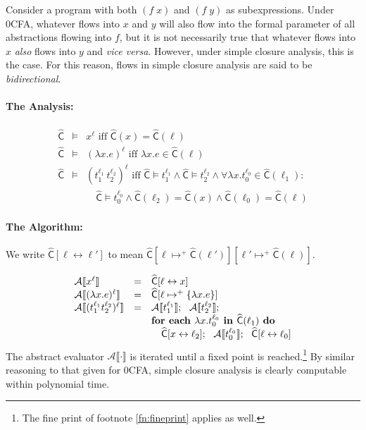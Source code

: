\documentclass{llncs}
\newcommand\av[1]{\ensuremath{\mathcal{A}\sem{#1}}}
\newcommand\sem[1]{\ensuremath{\llbracket #1 \rrbracket}}
\newcommand\cache{\widehat{\mathsf{C}}}
\begin{document}
Consider a program with both $(f\;x)$ and $(f\;y)$ as subexpressions.
Under 0CFA, whatever flows into $x$ and $y$ will also flow into the
formal parameter of all abstractions flowing into $f$, but it is not
necessarily true that whatever flows into $x$ {\em also} flows into
$y$ and {\em vice versa}.  However, under simple closure analysis,
this is the case.  For this reason, flows in simple closure analysis
are said to be {\em bidirectional}.

\paragraph{The Analysis:} 

\begin{eqnarray*}
\cache &\models & 
x^\ell \mbox{ iff } \cache(x) = \cache(\ell)\\
\cache &\models & 
(\lambda x .e)^\ell \mbox{ iff } \lambda x.e \in \cache(\ell)\\
\cache &\models & 
(t_1^{\ell_1}\ t_2^{\ell_2})^\ell \mbox{ iff } \cache\models t_1^{\ell_1} \wedge
\cache\models t_2^{\ell_2} \wedge \forall \lambda x.t_0^{\ell_0} \in \cache(\ell_1) : \\
\ & \ & \quad
  \cache\models t_0^{\ell_0} \wedge \cache(\ell_2) = \cache(x) \wedge
  \cache(\ell_0) = \cache(\ell)
\end{eqnarray*}

\paragraph{The Algorithm:} 

We write $\cache[\ell \leftrightarrow \ell']$ to mean
$\cache[\ell\mapsto^+ \cache(\ell')][\ell'\mapsto^+ \cache(\ell)]$.

\begin{displaymath}
\begin{array}{lcl}
\av{x^\ell}               & = & \cache[\ell \leftrightarrow x]\\
\av{(\lambda x.e)^\ell} & = & \cache[\ell \mapsto^+ \{ \lambda x.e \}]\\
\av{(t^{\ell_1}_1 t^{\ell_2}_2)^\ell} & = & \av{t^{\ell_1}_1};\ \ \av{t^{\ell_2}_2};\\
\ &\ & \mbox{\bf for each }\lambda x.t^{\ell_0}_0 \mbox{\bf\ in } \cache(\ell_1)\mbox{\bf\ do }\\
\ &\ &   \quad   \cache[x\leftrightarrow\ell_2];\ \ 
                 \av{t^{\ell_0}_0};\ \
                 \cache[\ell\leftrightarrow\ell_0]
\end{array}
\end{displaymath}
The abstract evaluator $\av{\cdot}$ is iterated until a fixed point is
reached.\footnote{The fine print of footnote \ref{fn:fineprint}
applies as well.}  By similar reasoning to that given for 0CFA, simple
closure analysis is clearly computable within polynomial time.
\end{document}
